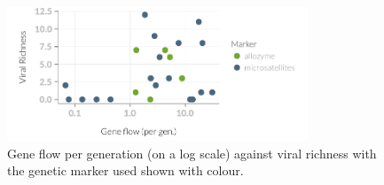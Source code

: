 \begin{knitrout}\footnotesize
{}\color{fgcolor}\begin{figure}[t]

{\centering \includegraphics[width=0.8\textwidth]{figure/fstRawData-1} 

}

\caption[Gene flow per generation (on a log scale) against viral richness with the genetic marker used shown with colour]{Gene flow per generation (on a log scale) against viral richness with the genetic marker used shown with colour.}\label{fig:fstRawData}
\end{figure}


\end{knitrout}













